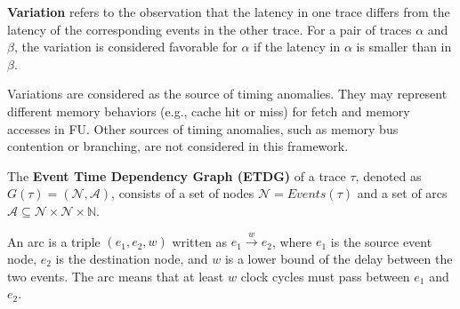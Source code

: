 \textbf{Variation} refers to the observation that the latency in one trace differs from the latency of the corresponding events in the other trace. For a pair of traces $\alpha$ and $\beta$, the variation is considered favorable for $\alpha$ if the latency in $\alpha$ is smaller than in $\beta$.

Variations are considered as the source of timing anomalies. They may represent different memory behaviors (e.g., cache hit or miss) for fetch and memory accesses in FU. Other sources of timing anomalies, such as memory bus contention or branching, are not considered in this framework.

The \textbf{Event Time Dependency Graph (ETDG)} of a trace $\tau$, denoted as $G(\tau) = (\mathcal{N}, \mathcal{A})$, consists of a set of nodes $\mathcal{N} = Events(\tau)$ and a set of arcs $\mathcal{A} \subseteq \mathcal{N} \times \mathcal{N} \times \mathbb{N}$.

An arc is a triple $(e_1, e_2, w)$ written as $e_1 \xrightarrow{w} e_2$, where $e_1$ is the source event node, $e_2$ is the destination node, and $w$ is a lower bound of the delay between the two events. The arc means that at least $w$ clock cycles must pass between $e_1$ and $e_2$. 

